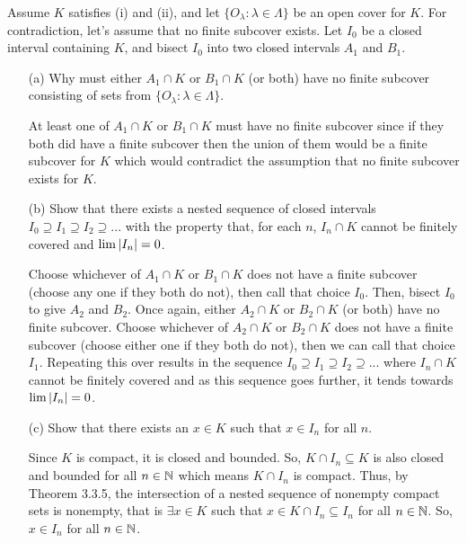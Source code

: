 \documentclass[12pt,letterpaper]{article}
\begin{document}
\begin{itemize}[leftmargin=!,labelindent=5pt]
            Assume $K$ satisfies (i) and (ii), and let $\{O_\lambda : \lambda \in \Lambda\}$ be an open cover for $K$. For contradiction, let’s assume that no finite subcover exists. Let $I_0$ be a closed interval containing $K$, and bisect $I_0$ into two closed intervals $A_1$ and $B_1$.
            \begin{itemize}
                \item [(a)] Why must either $A_1 \cap K$ or $B_1 \cap K$ (or both) have no finite subcover consisting of sets from $\{O_\lambda : \lambda \in \Lambda\}$.
                
                    At least one of $A_1 \cap K$ or $B_1 \cap K$ must have no finite subcover since if they both did have a finite subcover then the union of them would be a finite subcover for $K$ which would contradict the assumption that no finite subcover exists for $K$.
                \item [(b)] Show that there exists a nested sequence of closed intervals $I_0 \supseteq I_1 \supseteq I_2 \supseteq ... $ with the property that, for each $n$, $I_n \cap K$ cannot be finitely covered and $\lim \abs{I_n} = 0$.
                
                    Choose whichever of $A_1 \cap K$ or $B_1 \cap K$ does not have a finite subcover (choose any one if they both do not), then call that choice $I_0$.
                    Then, bisect $I_0$ to give $A_2$ and $B_2$.
                    Once again, either $A_2 \cap K$ or $B_2 \cap K$ (or both) have no finite subcover.
                    Choose whichever of $A_2 \cap K$ or $B_2 \cap K$ does not have a finite subcover (choose either one if they both do not), then we can call that choice $I_1$.
                    Repeating this over results in the sequence $I_0 \supseteq I_1 \supseteq I_2 \supseteq ... $ where $I_n \cap K$ cannot be finitely covered and as this sequence goes further, it tends towards $\lim \abs{I_n} = 0$.
                \item [(c)] Show that there exists an $x \in K$ such that $x \in I_n$ for all $n$.
                
                    Since $K$ is compact, it is closed and bounded.
                    So, $K \cap I_n \subseteq K$ is also closed and bounded for all $n \in \mathbb{N}$ which means $K \cap I_n$ is compact.
                    Thus, by Theorem 3.3.5, the intersection of a nested sequence of nonempty compact sets is nonempty, that is $\exists x \in K$ such that $x \in K \cap I_n \subseteq I_n$ for all $n \in \mathbb{N}$.
                    So, $x \in I_n$ for all $n \in \mathbb{N}$.


\end{itemize}
\end{itemize}
\end{document}
